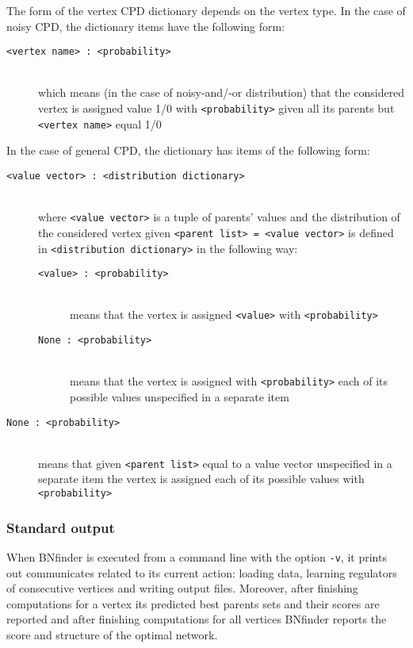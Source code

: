 The form of the vertex CPD dictionary depends on the vertex type.
In the case of noisy CPD, the dictionary items have the following form:
\begin{description}
\item[\texttt{<vertex name> : <probability>}]~\\
 which means (in the case of noisy-and/-or distribution) that the considered vertex is assigned value 1/0 with \texttt{<probability>} given all its parents but \texttt{<vertex name>} equal 1/0
\end{description}
In the case of general CPD, the dictionary has items of the following form:
\begin{description}
\item[\texttt{<value vector> : <distribution dictionary>}]~\\
 where \texttt{<value vector>} is a tuple of parents' values and the distribution of the considered vertex given \texttt{<parent list> = <value vector>} is defined in \texttt{<distribution dictionary>} in the following way:
\begin{description}
\item[\texttt{<value> : <probability>}]~\\
 means that the vertex is assigned \texttt{<value>} with \texttt{<probability>}
\item[\texttt{None : <probability>}]~\\
 means that the vertex is assigned with \texttt{<probability>} each of its possible values unspecified in a separate item
\end{description}
\item[\texttt{None : <probability>}]~\\
 means that given \texttt{<parent list>} equal to a value vector unspecified in a separate item the vertex is assigned each of its possible values with \texttt{<probability>}
\end{description}
 
\subsubsection{Standard output}

When BNfinder is executed from a command line with the option \texttt{-v}, 
it prints out communicates related to its current action: 
loading data, learning regulators of consecutive vertices and writing output files.
Moreover, after finishing computations for a vertex
its predicted best parents sets and their scores are reported
and after finishing computations for all vertices
BNfinder reports the score and structure of the optimal network.

